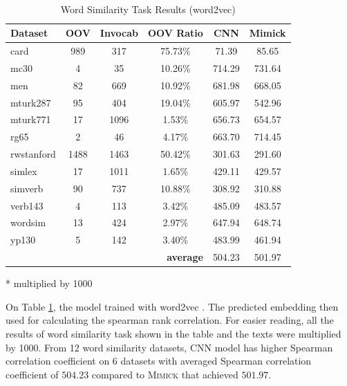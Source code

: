     \begin{table}[!ht]
      \begin{threeparttable} 
      \begin{center}
        \caption{Word Similarity Task Results (word2vec)}
        ~\\
        \label{tab:wordsim:word2vec}
        \begin{tabular}{l|c|c|c|c|c}
          \textbf{Dataset} & \textbf{OOV} & \textbf{Invocab} & \textbf{OOV Ratio} & \textbf{CNN}\tnote{*} & \textbf{Mimick}\tnote{*}\\
          \hline
          card & 989 & 317 & 75.73\% & 71.39 & 85.65\\
          mc30 & 4 & 35 & 10.26\% & 714.29 & 731.64\\
          men & 82 & 669 & 10.92\% & 681.98 & 668.05\\
          mturk287 & 95 & 404 & 19.04\% & 605.97 & 542.96\\
          mturk771 & 17 & 1096 & 1.53\% & 656.73 & 654.57\\
          rg65 & 2 & 46 & 4.17\% & 663.70 & 714.45\\
          rwstanford & 1488 & 1463 & 50.42\% & 301.63 & 291.60\\
          simlex & 17 & 1011 & 1.65\% & 429.11 & 429.57\\
          simverb & 90 & 737 & 10.88\% & 308.92 & 310.88\\
          verb143 & 4 & 113 & 3.42\% & 485.09 & 483.57\\
          wordsim & 13 & 424 & 2.97\% & 647.94 & 648.74\\
          yp130 & 5 & 142 & 3.40\% & 483.99 & 461.94\\
          \hline
          \multicolumn{4}{r|}{\textbf{average}} & 504.23 & 501.97\\
        \end{tabular}
        \begin{tablenotes}
          \item[*] multiplied by 1000
        \end{tablenotes}
      \end{center}
      
    \end{threeparttable} 
    \end{table}

    On Table \ref{tab:wordsim:word2vec}, the model trained with
    word2vec \citep{Distributed2013mikolov}. The predicted embedding
    then used for calculating the spearman rank correlation. For
    easier reading, all the results of word similarity task shown in
    the table and the texts were multiplied by 1000. From 12 word
    similarity datasets, CNN model has higher Spearman correlation
    coefficient on 6 datasets with averaged Spearman correlation
    coefficient of $504.23$ compared to \textsc{Mimick} that achieved
    $501.97$.


